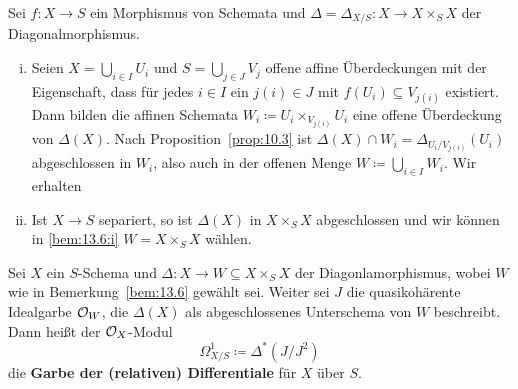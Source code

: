 \begin{bem}
\label{bem:13.6}
	Sei $f \colon X \to S$ ein Morphismus von Schemata und  $\Delta = \Delta_{X/S}\colon X \to X \times_S X$ der Diagonalmorphismus.
	\begin{enumerate}[i)]
		\item\label{bem:13.6:i} Seien $X=\bigcup_{i \in I}U_i$ und $S=\bigcup_{j \in J}V_j$ offene affine Überdeckungen mit der Eigenschaft, dass für jedes $i \in I$ ein $j(i) \in J$ mit
		$f(U_i)\subseteq V_{j(i)}$ existiert. Dann bilden die affinen Schemata $W_i \coloneqq U_i \times_{V_{j(i)}} U_i$ eine offene Überdeckung von $\Delta(X)$. Nach Proposition~\ref{prop:10.3} ist $\Delta(X) \cap W_i = \Delta_{U_i/V_{j(i)}}(U_i)$ abgeschlossen in $W_i$, also auch in der offenen Menge $W\coloneqq \bigcup_{i\in I} W_i$. Wir erhalten
		\begin{center}
		\end{center}
		\item\label{bem:13.6:ii} Ist $X\to S$ separiert, so ist $\Delta(X)$ in $X \times_S X$ abgeschlossen und wir können in \ref{bem:13.6:i} $W=X\times_S X$ wählen.
	\end{enumerate}
\end{bem}

\begin{defn}
\label{defn:13.7}
	Sei $X$ ein $S$-Schema und $\Delta\colon X \to W \subseteq X\times_S X$ der Diagonlamorphismus, wobei $W$ wie in Bemerkung~\ref{bem:13.6} gewählt sei. Weiter sei $J$ die quasikohärente Idealgarbe $\mathcal{O}_W$, die $\Delta(X)$ als abgeschlossenes Unterschema von $W$ beschreibt. Dann heißt der $\mathcal{O}_X$-Modul
	\[
		\Omega_{X/S}^1\coloneqq \Delta^*(J/J^2)
	\]
	die \textbf{Garbe der (relativen) Differentiale} für $X$ über $S$. 
\end{defn}

